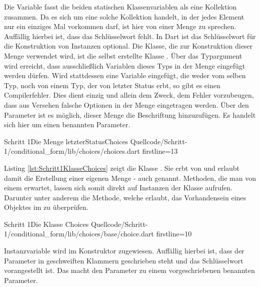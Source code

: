 Die Variable   fasst die beiden statischen Klassenvariablen als eine Kollektion zusammen.
Da es sich um eine solche Kollektion handelt, in der jedes Element nur ein einziges Mal vorkommen darf, ist hier von einer Menge zu sprechen.
Auffällig hierbei ist, dass das Schlüsselwort  fehlt.
In Dart ist das Schlüsselwort für die Konstruktion von Instanzen optional.
Die Klasse, die zur Konstruktion dieser Menge verwendet wird, ist die selbst erstellte Klasse .
Über das Typargument  wird erreicht, dass ausschließlich Variablen  dieses Typs in der Menge eingefügt werden dürfen.
Wird stattdessen eine Variable eingefügt, die weder vom selben Typ, noch von einem Typ, der von letzter Status erbt, so gibt es einen Compilerfehler.
Dies dient einzig und allein dem Zweck, dem  Fehler vorzubeugen, dass aus Versehen falsche Optionen in der Menge eingetragen werden.
Über den Parameter  ist es möglich, dieser Menge die Beschriftung  hinzuzufügen.
 Es handelt sich hier um einen  benannten Parameter.

\begin{alexlisting}{Schritt 1}{Die Menge letzterStatusChoices}
  {Quellcode/Schritt-1/conditional_form/lib/choices/choices.dart}
  {firstline=13}
  \label{lst:Schritt1DieMengeLetzterStatusChoices}
\end{alexlisting}

\clearpage

Listing \ref{lst:Schritt1KlasseChoices} zeigt die Klasse .
Sie erbt von  und erlaubt damit die Erstellung  einer eigenen Menge - auch  genannt.
Methoden, die man von einem  erwartet,  lassen sich somit direkt auf  Instanzen der Klasse  aufrufen.
Darunter unter anderem die  Methode,  welche erlaubt, das Vorhandensein eines Objektes im  zu überprüfen.

\begin{alexlisting}{Schritt 1}{Die Klasse Choices}
  {Quellcode/Schritt-1/conditional_form/lib/choices/base/choice.dart}
  {firstline=10}
  \label{lst:Schritt1KlasseChoices}
\end{alexlisting}

Instanzvariable   wird im Konstruktor  zugewiesen.
Auffällig hierbei ist, dass der Parameter in geschweiften Klammern geschrieben steht und das Schlüsselwort   vorangestellt ist.
Das macht den Parameter zu einem vorgeschriebenen benannten Parameter.

